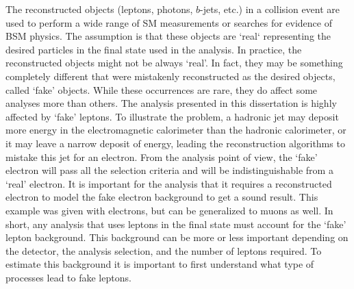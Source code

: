 The reconstructed objects (leptons, photons, $b$-jets, etc.) in a collision event are used to perform a wide range of SM measurements 
or searches for evidence of BSM physics. The assumption is that these objects are `real` representing the desired particles 
in the final state used in the analysis. 
In practice, the reconstructed objects might not be always `real'. In fact, they may be something completely different that
were mistakenly reconstructed as the desired objects, called `fake' objects.
While these occurrences are rare, they do affect some analyses more than others.
The analysis presented in this dissertation is highly affected by 
 `fake' leptons. 
To illustrate the problem, a hadronic jet may deposit more energy in the electromagnetic calorimeter than the hadronic calorimeter, 
or it may leave a narrow deposit of energy, leading the reconstruction algorithms to mistake this jet for an electron.
From the analysis point of view, the `fake' electron will pass all the selection criteria and will be indistinguishable from 
a `real' electron. 
It is important for the analysis that it requires a reconstructed electron to model the fake electron background to get a sound 
result. This example was given with electrons, but can be generalized to muons as well. 
In short, any analysis that uses leptons in the final state must account for the `fake' lepton background. 
This background can be more or less important depending on the detector, the analysis selection, and the number of leptons required. 
To estimate this background it is important to first understand what type of processes lead to fake leptons.
